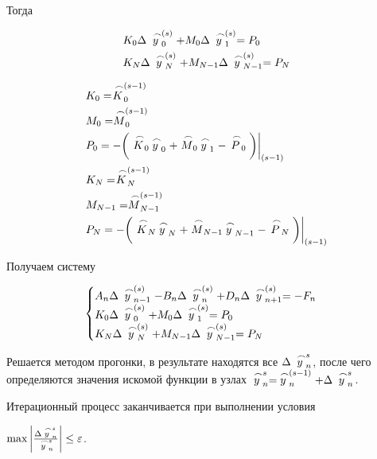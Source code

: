 \documentclass[a4paper,14pt]{extreport} %
\begin{document}
\begin{enumerate}
Тогда

\begin{equation*}
\begin{aligned}
&K_0\Delta\buildrel\,\,\frown\over{y}_{0}^{(s)}+M_0\Delta\buildrel\,\,\frown\over{y}_{1}^{(s)}=P_0\\
&K_N\Delta\buildrel\,\,\frown\over{y}_{N}^{(s)}+M_{N-1}\Delta\buildrel\,\,\frown\over{y}_{N-1}^{(s)}=P_N\\
\end{aligned}
\end{equation*}

\begin{equation*}
\begin{aligned}
&K_0=\buildrel\,\,\frown\over{K}_0^{(s-1)}\\
&M_0=\buildrel\,\,\frown\over{M}_0^{(s-1)}\\
&P_0=-\bigg( \buildrel\,\,\frown\over{K}_0 \buildrel\,\,\frown\over{y}_0+ \buildrel\,\,\frown\over{M}_0 \buildrel\,\,\frown\over{y}_1- \buildrel\,\,\frown\over{P}_0\bigg)\bigg|_{(s-1)}\\
&K_N=\buildrel\,\,\frown\over{K}_N^{(s-1)}\\
&M_{N-1}=\buildrel\,\,\frown\over{M}_{N-1}^{(s-1)}\\
&P_N=-\bigg( \buildrel\,\,\frown\over{K}_N \buildrel\,\,\frown\over{y}_N+ \buildrel\,\,\frown\over{M}_{N-1} \buildrel\,\,\frown\over{y}_{N-1}- \buildrel\,\,\frown\over{P}_N\bigg)\bigg|_{(s-1)}\\
\end{aligned}
\end{equation*}

Получаем систему

\begin{equation}
\begin{cases}
A_n\Delta\buildrel\,\,\frown\over{y}_{n-1}^{(s)}-B_n\Delta\buildrel\,\,\frown\over{y}_{n}^{(s)}+D_n\Delta\buildrel\,\,\frown\over{y}_{n+1}^{(s)}=-F_n\\
K_0\Delta\buildrel\,\,\frown\over{y}_{0}^{(s)}+M_0\Delta\buildrel\,\,\frown\over{y}_{1}^{(s)}=P_0\\
K_N\Delta\buildrel\,\,\frown\over{y}_{N}^{(s)}+M_{N-1}\Delta\buildrel\,\,\frown\over{y}_{N-1}^{(s)}=P_N\\
\end{cases}
\end{equation}

Решается методом прогонки, в результате находятся все $\Delta \buildrel\,\,\frown\over y_n^s$, после чего определяются значения искомой функции в узлах $ \buildrel\,\,\frown\over y_n^s=  \buildrel\,\,\frown\over y_n^{(s-1)}+\Delta \buildrel\,\,\frown\over y_n^s $. 

Итерационный процесс заканчивается при выполнении условия 

$\max\bigg|\frac{\Delta \buildrel\,\,\frown\over y_n^s}{\buildrel\,\,\frown\over y_n^s}\bigg|\le\varepsilon$. 

\end{enumerate}
\end{document}
